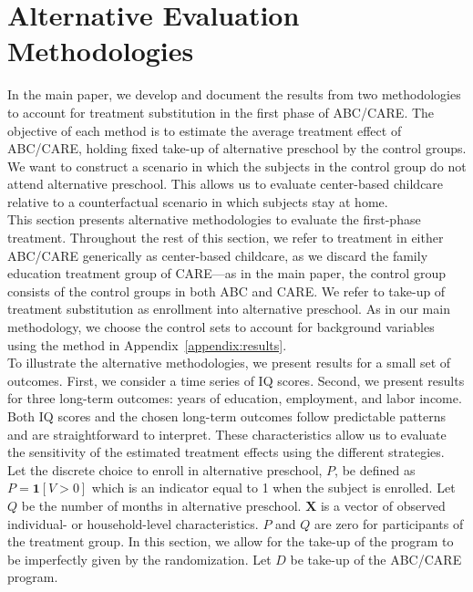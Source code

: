 \section{Alternative Evaluation Methodologies} \label{appendix:amethodology}

\noindent In the main paper, we develop and document the results from two methodologies to account for treatment substitution in the first phase of ABC/CARE. The objective of each method is to estimate the average treatment effect of ABC/CARE, holding fixed take-up of alternative preschool by the control groups. We want to construct a scenario in which the subjects in the control group do not attend alternative preschool. This allows us to evaluate center-based childcare relative to a counterfactual scenario in which subjects stay at home.\\

\noindent This section presents alternative methodologies to evaluate the first-phase treatment. Throughout the rest of this section, we refer to treatment in either ABC/CARE generically as center-based childcare, as we discard the family education treatment group of CARE---as in the main paper, the control group consists of the control groups in both ABC and CARE. We refer to take-up of treatment substitution as enrollment into alternative preschool. As in our main methodology, we choose the control sets to account for background variables using the method in Appendix~\ref{appendix:results}.\\

\noindent To illustrate the alternative methodologies, we present results for a small set of outcomes. First, we consider a time series of IQ scores. Second, we present results for three long-term outcomes: years of education, employment, and labor income. Both IQ scores and the chosen long-term outcomes follow predictable patterns and are straightforward to interpret. These characteristics allow us to evaluate the sensitivity of the estimated treatment effects using the different strategies.\\

\noindent Let the discrete choice to enroll in alternative preschool, $P$, be defined as $P=\mathbf{1}\left[V>0\right]$ which is an indicator equal to 1 when the subject is enrolled. Let $Q$ be the number of months in alternative preschool. $\mathbf{X}$ is a vector of observed individual- or household-level characteristics. $P$ and $Q$ are zero for participants of the treatment group. In this section, we allow for the take-up of the program to be imperfectly given by the randomization. Let $D$ be take-up of the ABC/CARE program.

